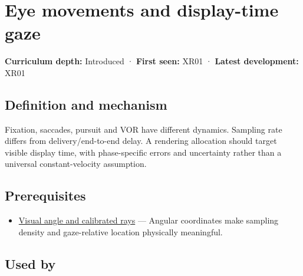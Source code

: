 \hypertarget{appendix-a6f2c4fe1996}{}\label{referencestart:appendix-a6f2c4fe1996}
\section{Eye movements and display-time gaze}\label{appendix-a6f2c4fe1996-eye-movements-and-display-time-gaze}

\hypertarget{appendix-a6f2c4fe1996-eye-movements-and-display-time-gaze}{}

\textbf{Curriculum depth:} Introduced · \textbf{First seen:} XR01 · \textbf{Latest development:} XR01

\begin{allmightroledefinition}

\subsection{Definition and mechanism}\label{appendix-a6f2c4fe1996-definition-and-mechanism}

\hypertarget{appendix-a6f2c4fe1996-definition-and-mechanism}{}

Fixation, saccades, pursuit and VOR have different dynamics. Sampling rate differs from delivery/end-to-end delay. A rendering allocation should target visible display time, with phase-specific errors and uncertainty rather than a universal constant-velocity assumption.

\end{allmightroledefinition}

\subsection{Prerequisites}\label{appendix-a6f2c4fe1996-prerequisites}

\hypertarget{appendix-a6f2c4fe1996-prerequisites}{}

\begin{itemize}
\tightlist
\item
  \hyperref[appendix-7d356c396d1a]{Visual angle and calibrated rays} --- Angular coordinates make sampling density and gaze-relative location physically meaningful.
\end{itemize}

\subsection{Used by}\label{appendix-a6f2c4fe1996-used-by}

\hypertarget{appendix-a6f2c4fe1996-used-by}{}


